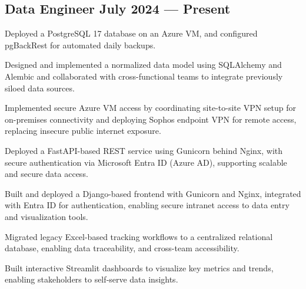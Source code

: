 \subsection{{Data Engineer  \hfill July 2024 --- Present}}
\begin{zitemize}
\item Deployed a PostgreSQL 17 database on an Azure VM, and configured pgBackRest for automated daily backups.
\item Designed and implemented a normalized data model using SQLAlchemy and Alembic and collaborated with cross-functional teams to integrate previously siloed data sources.
\item Implemented secure Azure VM access by coordinating site-to-site VPN setup for on-premises connectivity and deploying Sophos endpoint VPN for remote access, replacing insecure public internet exposure.
\item Deployed a FastAPI-based REST service using Gunicorn behind Nginx, with secure authentication via Microsoft Entra ID (Azure AD), supporting scalable and secure data access.
\item Built and deployed a Django-based frontend with Gunicorn and Nginx, integrated with Entra ID for authentication, enabling secure intranet access to data entry and visualization tools.
\item Migrated legacy Excel-based tracking workflows to a centralized relational database, enabling data traceability, and cross-team accessibility.
\item Built interactive Streamlit dashboards to visualize key metrics and trends, enabling stakeholders to self‑serve data insights.
\end{zitemize}

